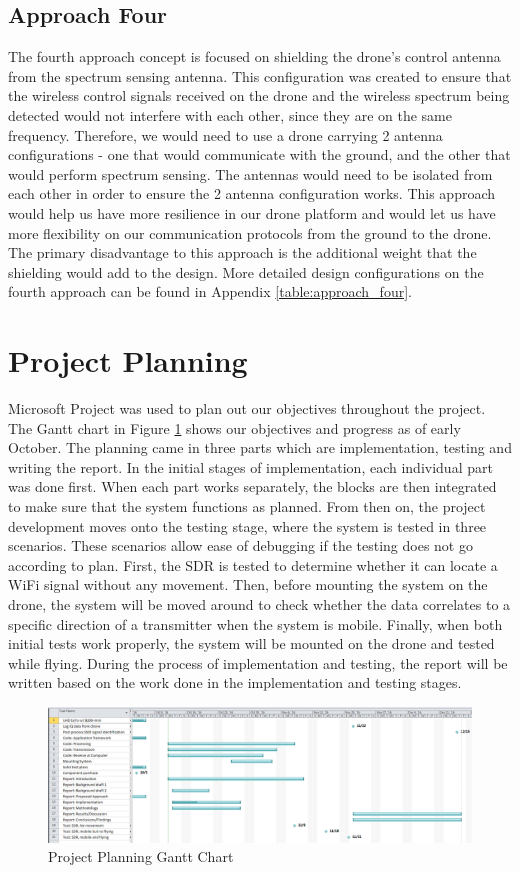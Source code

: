 \subsection{Approach Four}
The fourth approach concept is focused on shielding the drone’s control antenna from the spectrum sensing antenna. This configuration was created to ensure that the wireless control signals received on the drone and the wireless spectrum being detected would not interfere with each other, since they are on the same frequency. Therefore, we would need to use a drone carrying 2 antenna configurations - one that would communicate with the ground, and the other that would perform spectrum sensing. The antennas would need to be isolated from each other in order to ensure the 2 antenna configuration works. This approach would help us have more resilience in our drone platform and would let us have more flexibility on our communication protocols from the ground to the drone. The primary disadvantage to this approach is the additional weight that the shielding would add to the design. More detailed design configurations on the fourth approach can be found in Appendix \ref{table:approach_four}.

\section{Project Planning}
Microsoft Project was used to plan out our objectives throughout the project. The Gantt chart in Figure \ref{fig:gantt_chart} shows our objectives and progress as of early October. The planning came in three parts which are implementation, testing and writing the report. In the initial stages of implementation, each individual part was done first. When each part works separately, the blocks are then integrated to make sure that the system functions as planned. From then on, the project development moves onto the testing stage, where the system is tested in three scenarios. These scenarios allow ease of debugging if the testing does not go according to plan. First, the SDR is tested to determine whether it can locate a WiFi signal without any movement. Then, before mounting the system on the drone, the system will be moved around to check whether the data correlates to a specific direction of a transmitter when the system is mobile. Finally, when both initial tests work properly, the system will be mounted on the drone and tested while flying. During the process of implementation and testing, the report will be written based on the work done in the implementation and testing stages.
\begin{figure}[ht]
\centering
\includegraphics[width=1.0\textwidth]{img/oct_gantt_chart.png}
\caption{Project Planning Gantt Chart}
\label{fig:gantt_chart}
\end{figure}
